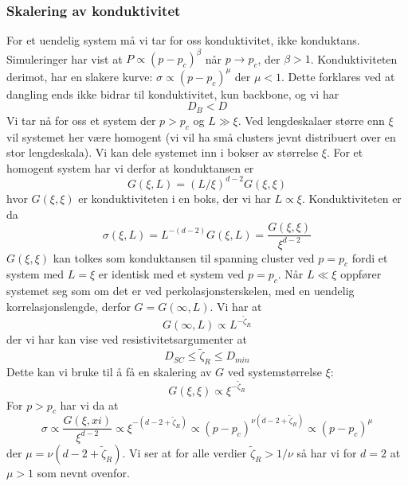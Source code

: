 \documentclass[english, a4paper]{article}
\begin{document}
\subsubsection{Skalering av konduktivitet}
For et uendelig system må vi tar for oss konduktivitet, ikke konduktans. 
Simuleringer har vist at $P \propto (p-p_c)^\beta$ når $p\to p_c$, der $\beta > 1$. 
Konduktiviteten derimot, har en slakere kurve: $\sigma \propto  (p - p_c)^\mu$ der $\mu < 1$. 
Dette forklares ved at dangling ends ikke bidrar til konduktivitet, kun backbone, og vi har 
\begin{equation}
 D_B < D
\end{equation}
Vi tar nå for oss et system der $p > p_c$ og $L \gg \xi$. Ved lengdeskalaer større enn $\xi$ vil systemet
her være homogent (vi vil ha små clusters jevnt distribuert over en stor lengdeskala). Vi kan dele systemet
inn i bokser av størrelse $\xi$. For et homogent system har vi derfor at konduktansen er
\begin{equation}
  G(\xi,L) = (L/\xi)^{d-2}G(\xi,\xi)
\end{equation}
hvor $G(\xi,\xi)$ er konduktiviteten i en boks, der vi har $L \propto \xi$. Konduktiviteten er da
\begin{equation}
 \sigma(\xi,L) = L^{-(d-2)}G(\xi,L) = \frac{G(\xi,\xi)}{\xi^{d-2}}
\end{equation}
$G(\xi,\xi)$ kan tolkes som konduktansen til spanning cluster ved $p=p_c$ fordi et system med $L=\xi$ er identisk 
med et system ved $p = p_c$. Når $L \ll \xi$ oppfører systemet seg som om det er ved perkolasjonsterskelen, med 
en uendelig korrelasjonslengde, derfor $G = G(\infty,L)$. Vi har at
\begin{equation}
 G(\infty,L) \propto L^{-\tilde{\zeta}_R}
\end{equation}
der vi har kan vise ved resistivitetsargumenter at
\begin{equation}
 D_{SC} \leq \tilde{\zeta}_R \leq D_{min}
\end{equation}
Dette kan vi bruke til å få en skalering av $G$ ved systemstørrelse $\xi$:
\begin{equation}
 G(\xi,\xi) \propto \xi^{-\tilde{\zeta}_R}
\end{equation}
For $p > p_c$ har vi da at
\begin{equation}
 \sigma \propto \frac{G(\xi,xi)}{\xi^{d-2}} \propto \xi^{-(d-2+\tilde{\zeta}_R)}
 \propto (p-p_c)^{\nu(d-2+\tilde{\zeta}_R)} \propto (p-p_c)^\mu
\end{equation}
der $\mu = \nu(d - 2 + \tilde{\zeta}_R)$. Vi ser at for alle verdier $\tilde{\zeta}_R > 1/\nu$ så har vi 
for $d=2$ at $\mu > 1$ som nevnt ovenfor. 















 
\end{document}
